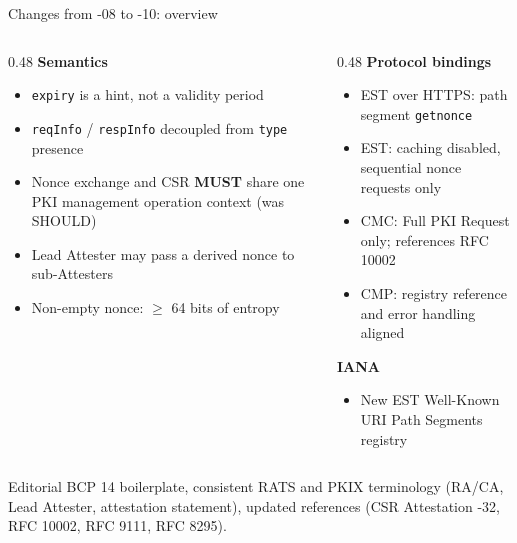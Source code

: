 \documentclass[aspectratio=169,10pt]{beamer}
\begin{document}
\begin{frame}{Changes from -08 to -10: overview}
  \small
  \begin{columns}[T,onlytextwidth]
    \begin{column}{0.48\textwidth}
      \textbf{\color{ietfblue}Semantics}
      \begin{itemize}
        \item \texttt{expiry} is a hint, not a validity period
        \item \texttt{reqInfo} / \texttt{respInfo} decoupled from \texttt{type} presence
        \item Nonce exchange and CSR \textbf{MUST} share one PKI management
              operation context (was SHOULD)
        \item Lead Attester may pass a derived nonce to sub-Attesters
        \item Non-empty nonce: $\geq$ 64 bits of entropy
      \end{itemize}
    \end{column}
    \begin{column}{0.48\textwidth}
      \textbf{\color{ietfblue}Protocol bindings}
      \begin{itemize}
        \item EST over HTTPS: path segment \texttt{getnonce}
        \item EST: caching disabled, sequential nonce requests only
        \item CMC: Full PKI Request only; references RFC 10002
        \item CMP: registry reference and error handling aligned
      \end{itemize}
      \vspace{0.15cm}
      \textbf{\color{ietfblue}IANA}
      \begin{itemize}
        \item New EST Well-Known URI Path Segments registry
      \end{itemize}
    \end{column}
  \end{columns}
  \vspace{0.1cm}
  \begin{block}{Editorial}
    BCP 14 boilerplate, consistent RATS and PKIX terminology
    (RA/CA, Lead Attester, attestation statement), updated references
    (CSR Attestation -32, RFC 10002, RFC 9111, RFC 8295).
  \end{block}
\end{frame}
\end{document}
